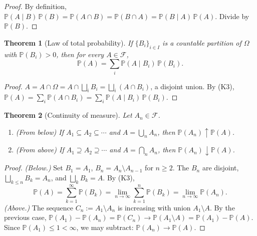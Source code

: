 \documentclass[11pt]{article}
\newtheorem{theorem}{Theorem}[section]
\theoremstyle{remark}
\begin{document}
\begin{proof}
By definition, $\mathbb{P}(A \mid B)\,\mathbb{P}(B) = \mathbb{P}(A \cap B) = \mathbb{P}(B \cap A) = \mathbb{P}(B \mid A)\,\mathbb{P}(A)$. Divide by $\mathbb{P}(B)$.
\end{proof}

\begin{theorem}[Law of total probability]
If $\{B_{i}\}_{i \in I}$ is a countable partition of $\Omega$ with $\mathbb{P}(B_{i}) > 0$, then for every $A \in \mathcal{F}$,
\[
  \mathbb{P}(A) = \sum_{i} \mathbb{P}(A \mid B_{i})\,\mathbb{P}(B_{i}).
\]
\end{theorem}

\begin{proof}
$A = A \cap \Omega = A \cap \bigsqcup_{i} B_{i} = \bigsqcup_{i} (A \cap B_{i})$, a disjoint union. By (K3), $\mathbb{P}(A) = \sum_{i} \mathbb{P}(A \cap B_{i}) = \sum_{i} \mathbb{P}(A \mid B_{i})\,\mathbb{P}(B_{i})$.
\end{proof}

\begin{theorem}[Continuity of measure]
Let $A_{n} \in \mathcal{F}$.
\begin{enumerate}
  \item \emph{(From below)} If $A_{1} \subseteq A_{2} \subseteq \cdots$ and $A = \bigcup_{n} A_{n}$, then $\mathbb{P}(A_{n}) \uparrow \mathbb{P}(A)$.
  \item \emph{(From above)} If $A_{1} \supseteq A_{2} \supseteq \cdots$ and $A = \bigcap_{n} A_{n}$, then $\mathbb{P}(A_{n}) \downarrow \mathbb{P}(A)$.
\end{enumerate}
\end{theorem}

\begin{proof}
\emph{(Below.)} Set $B_{1} = A_{1}$, $B_{n} = A_{n} \setminus A_{n-1}$ for $n \geq 2$. The $B_{n}$ are disjoint, $\bigsqcup_{k \leq n} B_{k} = A_{n}$, and $\bigsqcup_{k} B_{k} = A$. By (K3),
\[
  \mathbb{P}(A) = \sum_{k=1}^{\infty} \mathbb{P}(B_{k}) = \lim_{n \to \infty} \sum_{k=1}^{n} \mathbb{P}(B_{k}) = \lim_{n \to \infty} \mathbb{P}(A_{n}).
\]
\emph{(Above.)} The sequence $C_{n} := A_{1} \setminus A_{n}$ is increasing with union $A_{1} \setminus A$. By the previous case, $\mathbb{P}(A_{1}) - \mathbb{P}(A_{n}) = \mathbb{P}(C_{n}) \to \mathbb{P}(A_{1} \setminus A) = \mathbb{P}(A_{1}) - \mathbb{P}(A)$. Since $\mathbb{P}(A_{1}) \leq 1 < \infty$, we may subtract: $\mathbb{P}(A_{n}) \to \mathbb{P}(A)$.
\end{proof}
\end{document}
